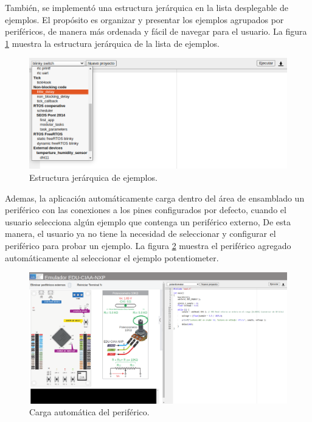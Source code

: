 \hfill \break

También, se implementó una estructura jerárquica en la lista desplegable de ejemplos. El propósito es organizar y presentar los ejemplos agrupados por periféricos, de manera más ordenada y fácil de navegar para el usuario. La figura \ref{fig:listExamples} muestra la estructura jerárquica de la lista de ejemplos.

\begin{figure}[ht]
	\centering
	\includegraphics[scale=.42]{./Figures/listExamples.jpg}
	\caption{Estructura jerárquica de ejemplos. }
	\label{fig:listExamples}
\end{figure}

Ademas, la aplicación automáticamente carga dentro del área de ensamblado un periférico con las conexiones a los pines configurados por defecto, cuando el usuario selecciona algún ejemplo que contenga un periférico externo, De esta manera, el usuario ya no tiene la necesidad de seleccionar y configurar el periférico para probar un ejemplo. La figura \ref{fig:cargarPeriferico} muestra el periférico agregado automáticamente al seleccionar el ejemplo \textquotedbl potentiometer\textquotedbl.

\begin{figure}[ht]
	\centering
	\includegraphics[scale=.31]{./Figures/cargarPeriferico.png}
	\caption{Carga automática del periférico. }
	\label{fig:cargarPeriferico}
\end{figure}

